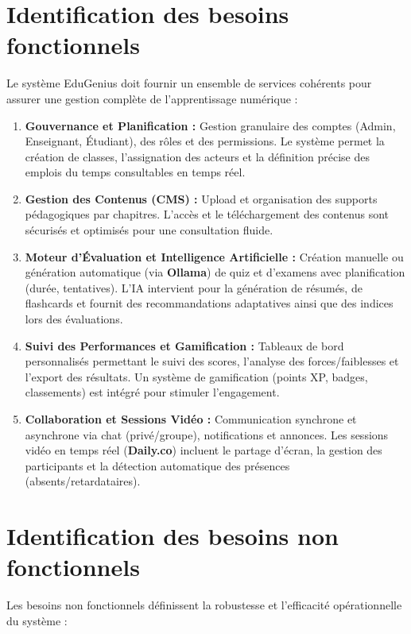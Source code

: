 \section{Identification des besoins fonctionnels}

Le système EduGenius doit fournir un ensemble de services cohérents pour assurer une gestion complète de l'apprentissage numérique :

\begin{enumerate}
    \item \textbf{Gouvernance et Planification :} Gestion granulaire des comptes (Admin, Enseignant, Étudiant), des rôles et des permissions. Le système permet la création de classes, l'assignation des acteurs et la définition précise des emplois du temps consultables en temps réel.
    \item \textbf{Gestion des Contenus (CMS) :} Upload et organisation des supports pédagogiques par chapitres. L'accès et le téléchargement des contenus sont sécurisés et optimisés pour une consultation fluide.
    \item \textbf{Moteur d'Évaluation et Intelligence Artificielle :} Création manuelle ou génération automatique (via \textbf{Ollama}) de quiz et d'examens avec planification (durée, tentatives). L'IA intervient pour la génération de résumés, de flashcards et fournit des recommandations adaptatives ainsi que des indices lors des évaluations.
    \item \textbf{Suivi des Performances et Gamification :} Tableaux de bord personnalisés permettant le suivi des scores, l'analyse des forces/faiblesses et l'export des résultats. Un système de gamification (points XP, badges, classements) est intégré pour stimuler l'engagement.
    \item \textbf{Collaboration et Sessions Vidéo :} Communication synchrone et asynchrone via chat (privé/groupe), notifications et annonces. Les sessions vidéo en temps réel (\textbf{Daily.co}) incluent le partage d'écran, la gestion des participants et la détection automatique des présences (absents/retardataires).
\end{enumerate}

\section{Identification des besoins non fonctionnels}

Les besoins non fonctionnels définissent la robustesse et l'efficacité opérationnelle du système :

